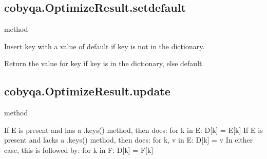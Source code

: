 \documentclass[letterpaper,10pt,english]{sphinxmanual}
\begin{document}
\begin{fulllineitems}
\begin{fulllineitems}
\end{fulllineitems}



\subsection{cobyqa.OptimizeResult.setdefault}
\label{\detokenize{refs/generated/cobyqa.OptimizeResult.setdefault:cobyqa-optimizeresult-setdefault}}\label{\detokenize{refs/generated/cobyqa.OptimizeResult.setdefault::doc}}
\sphinxAtStartPar
method

\begin{fulllineitems}
\label{\detokenize{refs/generated/cobyqa.OptimizeResult.setdefault:cobyqa.OptimizeResult.setdefault}}
\sphinxAtStartPar
Insert key with a value of default if key is not in the dictionary.

\sphinxAtStartPar
Return the value for key if key is in the dictionary, else default.

\end{fulllineitems}



\subsection{cobyqa.OptimizeResult.update}
\label{\detokenize{refs/generated/cobyqa.OptimizeResult.update:cobyqa-optimizeresult-update}}\label{\detokenize{refs/generated/cobyqa.OptimizeResult.update::doc}}
\sphinxAtStartPar
method

\begin{fulllineitems}
\label{\detokenize{refs/generated/cobyqa.OptimizeResult.update:cobyqa.OptimizeResult.update}}
\sphinxAtStartPar
If E is present and has a .keys() method, then does:  for k in E: D{[}k{]} = E{[}k{]}
If E is present and lacks a .keys() method, then does:  for k, v in E: D{[}k{]} = v
In either case, this is followed by: for k in F:  D{[}k{]} = F{[}k{]}


\end{fulllineitems}
\end{fulllineitems}
\end{document}
